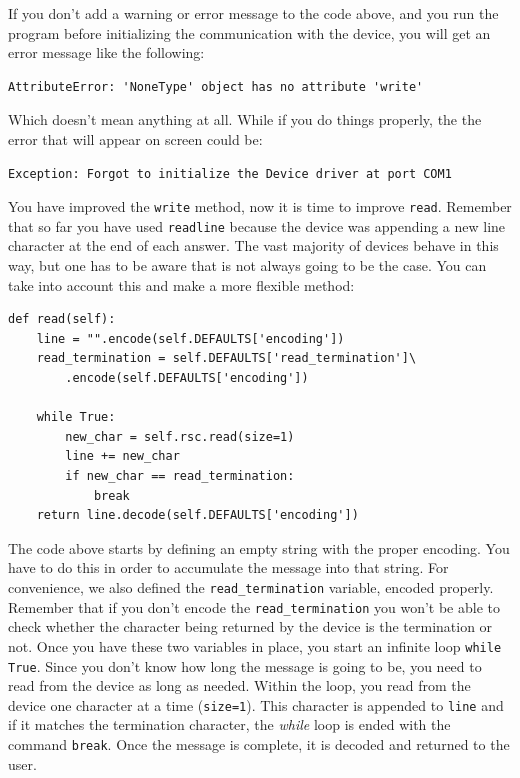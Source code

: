 If you don't add a warning or error message to the code above, and you run
the program before initializing the communication with the device, you
will get an error message like the following:

\begin{verbatim}
AttributeError: 'NoneType' object has no attribute 'write'
\end{verbatim}

Which doesn't mean anything at all. While if you do things properly, the
the error that will appear on screen could be:

\begin{verbatim}
Exception: Forgot to initialize the Device driver at port COM1
\end{verbatim}

You have improved the \texttt{write} method, now it is time to improve
\texttt{read}. Remember that so far you have used \texttt{readline}
because the device was appending a new line character at the end of each
answer. The vast majority of devices behave in this way, but one has to
be aware that is not always going to be the case. You can take into
account this and make a more flexible method:

\begin{verbatim}
def read(self):
    line = "".encode(self.DEFAULTS['encoding'])
    read_termination = self.DEFAULTS['read_termination']\
        .encode(self.DEFAULTS['encoding'])
    
    while True:
        new_char = self.rsc.read(size=1)
        line += new_char
        if new_char == read_termination:
            break
    return line.decode(self.DEFAULTS['encoding'])
\end{verbatim}

The code above starts by defining an empty string with the proper
encoding. You have to do this in order to accumulate the message into
that string. For convenience, we also defined the
\texttt{read_termination} variable, encoded properly. Remember that if
you don't encode the \texttt{read_termination} you won't be able to
check whether the character being returned by the device is the
termination or not. Once you have these two variables in place, you
start an infinite loop \texttt{while True}. Since you don't know how
long the message is going to be, you need to read from the device as
long as needed. Within the loop, you read from the device one
character at a time (\texttt{size=1}). This character is appended to
\texttt{line} and if it matches the termination character, the
\emph{while} loop is ended with the command \texttt{break}. Once the message is
complete, it is decoded and returned to the user.


